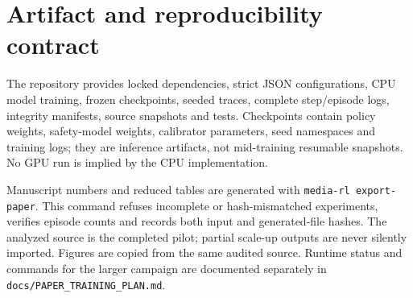 \documentclass[10pt]{article}
\providecommand{\evidencepath}{generated}
\begin{document}
\appendix
\section{Artifact and reproducibility contract}
The repository provides locked dependencies, strict JSON configurations, CPU model training, frozen checkpoints, seeded traces, complete step/episode logs, integrity manifests, source snapshots and tests. Checkpoints contain policy weights, safety-model weights, calibrator parameters, seed namespaces and training logs; they are inference artifacts, not mid-training resumable snapshots. No GPU run is implied by the CPU implementation.

Manuscript numbers and reduced tables are generated with \texttt{media-rl export-paper}. This command refuses incomplete or hash-mismatched experiments, verifies episode counts and records both input and generated-file hashes. The analyzed source is the completed pilot; partial scale-up outputs are never silently imported. Figures are copied from the same audited source. Runtime status and commands for the larger campaign are documented separately in \texttt{docs/PAPER\_TRAINING\_PLAN.md}.

\begin{table}[ht]
\centering\resizebox{\textwidth}{!}{}
\caption{Generated paired RLCD-minus-reference effects. Violation-rate contrasts are percentage points; QoE contrasts use reward units. Negative violation differences favor RLCD, while positive QoE differences favor RLCD. Intervals are exploratory and conditional on the fixed trace panel.}
\end{table}



\end{document}
